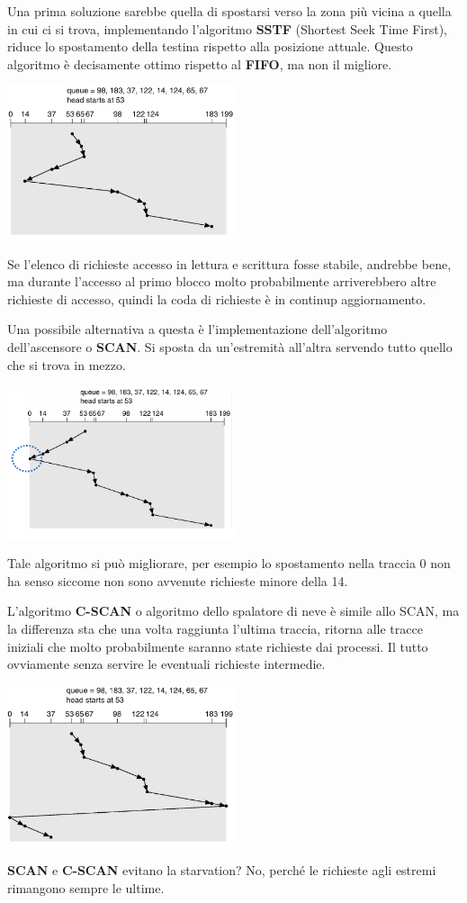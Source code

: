 \documentclass[a4paper, 12pt]{book}
\begin{document}
Una prima soluzione sarebbe quella di spostarsi verso la 
zona più vicina a quella in cui ci si trova, implementando 
l'algoritmo \textbf{SSTF} (Shortest Seek Time First), riduce 
lo spostamento della testina rispetto alla posizione attuale.
Questo algoritmo è decisamente ottimo rispetto al \textbf{FIFO}, 
ma non il migliore.
\begin{center}
    \includegraphics[width=0.5\textwidth]{sstf.png}
\end{center}
Se l'elenco di richieste accesso in lettura e scrittura fosse 
stabile, andrebbe bene, ma durante l'accesso al primo blocco
molto probabilmente arriverebbero altre richieste di accesso, 
quindi la coda di richieste è in continup aggiornamento.

Una possibile alternativa a questa è l'implementazione 
dell'algoritmo dell'ascensore o \textbf{SCAN}. Si sposta 
da un'estremità all'altra servendo tutto quello che si trova 
in mezzo.
\begin{center}
    \includegraphics[width=0.5\textwidth]{scan.png}
\end{center}
Tale algoritmo si può migliorare, per esempio lo spostamento
nella traccia 0 non ha senso siccome non sono avvenute richieste 
minore della 14.

L'algoritmo \textbf{C-SCAN} o algoritmo dello spalatore 
di neve è simile allo SCAN, ma la differenza sta che una
volta raggiunta l'ultima traccia, ritorna alle tracce iniziali 
che molto probabilmente saranno state richieste dai processi.
Il tutto ovviamente senza servire le eventuali richieste 
intermedie.
\begin{center}
    \includegraphics[width=0.5\textwidth]{c-scan.png}
\end{center}
\textbf{SCAN} e \textbf{C-SCAN} evitano la starvation?
No, perché le richieste agli estremi rimangono sempre le 
ultime.
\end{document}
